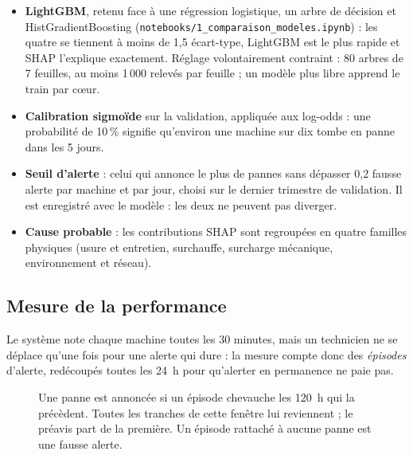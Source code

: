 \documentclass[11pt,a4paper]{article}
\newcommand{\var}[1]{\texttt{#1}}
\begin{document}
\begin{itemize}
  \item \textbf{LightGBM}, retenu face à une régression logistique, un arbre de décision et HistGradientBoosting
        (\var{notebooks/1\_comparaison\_modeles.ipynb}) : les quatre se tiennent à moins de 1,5 écart-type, LightGBM est
        le plus rapide et SHAP l'explique exactement. Réglage volontairement contraint : 80 arbres de 7 feuilles, au
        moins 1\,000 relevés par feuille ; un modèle plus libre apprend le train par cœur.
  \item \textbf{Calibration sigmoïde} sur la validation, appliquée aux log-odds : une probabilité de 10\,\% signifie
        qu'environ une machine sur dix tombe en panne dans les 5 jours.
  \item \textbf{Seuil d'alerte} : celui qui annonce le plus de pannes sans dépasser 0,2 fausse alerte par machine et
        par jour, choisi sur le dernier trimestre de validation. Il est enregistré avec le modèle : les deux ne
        peuvent pas diverger.
  \item \textbf{Cause probable} : les contributions SHAP sont regroupées en quatre familles physiques (usure et
        entretien, surchauffe, surcharge mécanique, environnement et réseau).
\end{itemize}

\subsection{Mesure de la performance}

Le système note chaque machine toutes les 30 minutes, mais un technicien ne se déplace qu'une fois pour une alerte qui
dure : la mesure compte donc des \emph{épisodes} d'alerte, redécoupés toutes les 24~h pour qu'alerter en permanence
ne paie pas.

\begin{figure}[H]
\centering
{}
\caption{Une panne est annoncée si un épisode chevauche les 120~h qui la précèdent. Toutes les tranches de cette
fenêtre lui reviennent ; le préavis part de la première. Un épisode rattaché à aucune panne est une fausse alerte.}
\end{figure}
\end{document}
